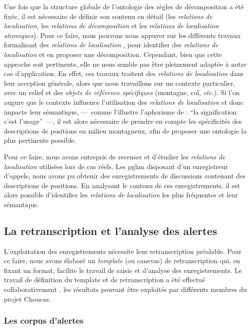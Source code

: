 Une fois que la structure globale de l'ontologie des règles de
décomposition a été fixée, il est nécessaire de définir son contenu en
détail (\ie les \emph{relations de localisation,} les \emph{relations
  de décomposition} et les \emph{relations de localisation
  atomiques}). Pour ce faire, nous pouvons nous appuyer sur les
différents travaux formalisant des \emph{relations de localisation}
\autocite{Vandeloise1986,Aurnague1997,Borillo1998}, pour identifier
des \emph{relations de localisation} et en proposer une
décomposition. Cependant, bien que cette approche soit pertinente,
elle ne nous semble pas être pleinement adaptée à notre cas
d’application. En effet, ces travaux traitent des \emph{relations de
  localisation} dans leur acception générale, alors que nous
travaillons sur un contexte particulier, avec un relief et des
\emph{objets de référence spécifiques} (\eg montagne, col,
\emph{etc.}). Si l'on augure que le contexte influence l’utilisation
des \emph{relations de localisation} et donc impacte leur sémantique,
---~comme l'illustre l'aphorisme de \textcite{Wittgenstein1953} :
\enquote{la signification c'est l'usage}~---, il est alors nécessaire
de prendre en compte les spécificités des descriptions de positions en
milieu montagneux, afin de proposer une ontologie la plus pertinente
possible.

Pour ce faire, nous avons entrepris de recenser et d'étudier les
\emph{relations de localisation} utilisées lors de cas réels. Les
\ac{pghm} disposant d'un enregistreur d'appels, nous avons pu obtenir
des enregistrements de discussions contenant des descriptions de
positions. En analysant le contenu de ces enregistrements, il est
alors possible d'identifier les \emph{relations de localisation} les
plus fréquentes et leur sémantique.

\subsection{La retranscription et l'analyse des alertes}

L'exploitation des enregistrements nécessite leur retranscription
préalable. Pour ce faire, nous avons élaboré un \emph{template} (ou
canevas) de retranscription qui, en fixant un format, facilite le
travail de saisie et d'analyse des enregistrements. Le travail de
définition du template et de retranscription a été effectué
collaborativement \autocite{Bunel2019}, les résultats pouvant être
exploités par différents membres du projet Choucas.

\subsubsection{Les corpus d'alertes}

